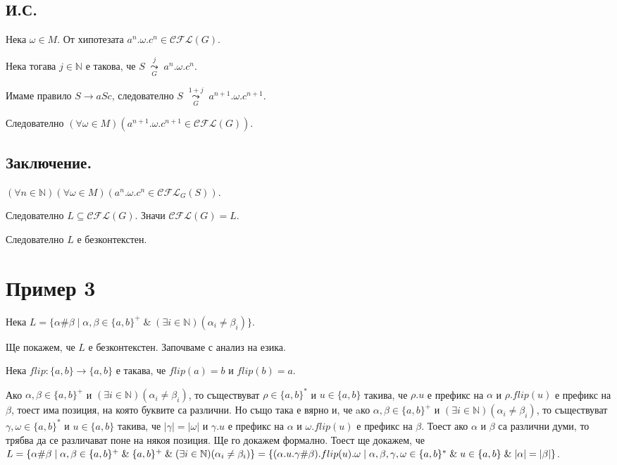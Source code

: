 \documentclass[12pt]{article}
\begin{document}
\subsection*{И.С.}
Нека \(\omega \in M\). От хипотезата \(a^n.\omega.c^n \in \mathcal{CFL}(G)\).

Нека тогава \(j \in \mathbb{N}\) е такова, че \(S \;\underset{G}{\overset{j}{\leadsto}}\; a^n.\omega.c^n\).

Имаме правило \(S \to aSc\), следователно \(S \;\underset{G}{\overset{1 + j}{\leadsto}}\; a^{n + 1}.\omega.c^{n + 1}\).

Следователно \((\forall \omega \in M)(a^{n + 1}.\omega.c^{n + 1} \in \mathcal{CFL}(G))\).

\subsection*{Заключение.}
\((\forall n \in \mathbb{N})(\forall \omega \in M)(a^n.\omega.c^n \in \mathcal{CFL}_G(S))\).

Следователно \(L \subseteq \mathcal{CFL}(G)\). Значи \(\mathcal{CFL}(G) = L\).

Следователно \(L\) е безконтекстен.

\section*{Пример 3}
Нека \(L = \{\alpha\#\beta \mid \alpha, \beta \in \{a, b\}^+ \;\&\; (\exists i \in \mathbb N)(\alpha_i \neq \beta_i)\}\).

Ще покажем, че \(L\) е безконтекстен. Започваме с анализ на езика.

\vspace*{5mm}

\par Нека \(flip : \{a, b\} \to \{a, b\} \) е такава, че \(flip(a) = b\) и \(flip(b) = a\).

\vspace*{5mm}

\par Ако \(\alpha, \beta \in \{a, b\}^+\) и \((\exists i \in \mathbb N)(\alpha_i \neq \beta_i)\), то съществуват \(\rho \in \{a, b\}^*\) и \(u \in \{a, b\}\) такива, че \(\rho.u\) е префикс на \(\alpha\) и \(\rho . flip(u)\) е префикс на \(\beta\), тоест има позиция, на която буквите са различни. Но също така е вярно и, че aко \(\alpha, \beta \in \{a, b\}^+\) и \((\exists i \in \mathbb N)(\alpha_i \neq \beta_i)\), то съществуват \(\gamma, \omega \in \{a, b\}^*\) и \(u \in \{a, b\}\) такива,
че \(|\gamma| = |\omega|\) и  \(\gamma.u\) е префикс на \(\alpha\) и \(\omega . flip(u)\) е префикс на \(\beta\).
Тоест ако \(\alpha\) и \(\beta\) са различни думи, то трябва да се различават поне на някоя позиция. Ще го докажем формално.
Тоест ще докажем, че
\(L = \{\alpha\#\beta \mid \alpha, \beta \in \{a, b\}^+ \;\&\; \{a, b\}^+ \;\&\; (\exists i \in \mathbb N)(\alpha_i \neq \beta_i)\} = \\ \{(\alpha.u.\gamma\#\beta).flip(u).\omega \mid \alpha, \beta, \gamma, \omega \in \{a, b\}^* \;\&\; u \in \{a, b\} \;\&\; |\alpha| = |\beta|\}\).
\end{document}
